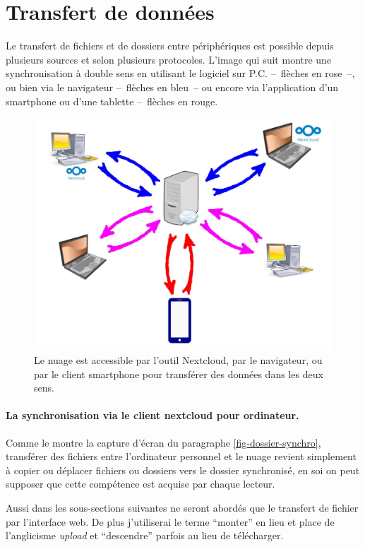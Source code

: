 \section{Transfert de données}
Le transfert de fichiers et de dossiers entre périphériques est possible depuis plusieurs sources et selon plusieurs protocoles. 
L'image qui suit montre une synchronisation à double sens en utilisant le logiciel sur P.C. --~flèches en rose~--, ou bien via le navigateur --~flèches en bleu~-- ou encore via l'application d'un smartphone ou d'une tablette --~flèches en rouge.
\begin{figure}
	\centering
	\includegraphics{./Captures/synchro.nextcloud.nuage.jpg}
	\caption{Le nuage est accessible par l'outil Nextcloud, par le navigateur, ou par le client smartphone pour transférer des données dans les deux sens.}
\end{figure}

\paragraph{La synchronisation via le client nextcloud pour ordinateur.} 
Comme le montre la capture d'écran du paragraphe \ref{fig-dossier-synchro}, transférer des fichiers entre l'ordinateur personnel et le nuage revient simplement à copier ou déplacer fichiers ou dossiers vers le dossier synchronisé, en soi on peut supposer que cette compétence est acquise par chaque lecteur.

Aussi dans les sous-sections suivantes ne seront abordés que le transfert de fichier par l'interface web.
De plus j'utiliserai le terme ``monter'' en lieu et place de l'anglicisme \emph{upload} et ``descendre'' parfois au lieu de télécharger.

